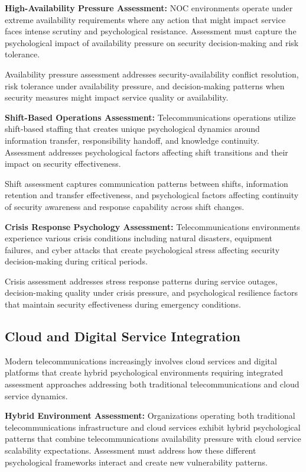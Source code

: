\documentclass[10pt, twocolumn]{article}
\begin{document}
\textbf{High-Availability Pressure Assessment:} NOC environments operate under extreme availability requirements where any action that might impact service faces intense scrutiny and psychological resistance. Assessment must capture the psychological impact of availability pressure on security decision-making and risk tolerance.

Availability pressure assessment addresses security-availability conflict resolution, risk tolerance under availability pressure, and decision-making patterns when security measures might impact service quality or availability.

\textbf{Shift-Based Operations Assessment:} Telecommunications operations utilize shift-based staffing that creates unique psychological dynamics around information transfer, responsibility handoff, and knowledge continuity. Assessment addresses psychological factors affecting shift transitions and their impact on security effectiveness.

Shift assessment captures communication patterns between shifts, information retention and transfer effectiveness, and psychological factors affecting continuity of security awareness and response capability across shift changes.

\textbf{Crisis Response Psychology Assessment:} Telecommunications environments experience various crisis conditions including natural disasters, equipment failures, and cyber attacks that create psychological stress affecting security decision-making during critical periods.

Crisis assessment addresses stress response patterns during service outages, decision-making quality under crisis pressure, and psychological resilience factors that maintain security effectiveness during emergency conditions.

\subsection{Cloud and Digital Service Integration}

Modern telecommunications increasingly involves cloud services and digital platforms that create hybrid psychological environments requiring integrated assessment approaches addressing both traditional telecommunications and cloud service dynamics.

\textbf{Hybrid Environment Assessment:} Organizations operating both traditional telecommunications infrastructure and cloud services exhibit hybrid psychological patterns that combine telecommunications availability pressure with cloud service scalability expectations. Assessment must address how these different psychological frameworks interact and create new vulnerability patterns.
\end{document}
